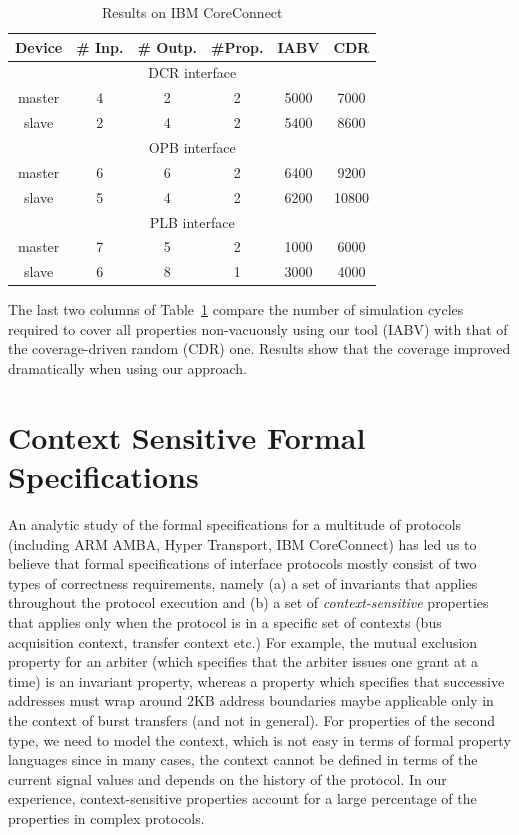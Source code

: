\documentclass[a4paper, 11pt]{article}
\begin{document}
\begin{table}[!t]
\begin{center}
{\small
\begin{tabular}{|c|c|c|c|c|c|} \hline
Device    & \# Inp.    & \# Outp. & \#Prop. & IABV & CDR   \\
\hline %
\multicolumn{6}{|c|}{DCR interface} \\ \hline
master & 4 & 2 & 2 & 5000 & 7000 \\
slave  & 2 & 4 & 2 & 5400 & 8600 \\
\hline
\multicolumn{6}{|c|}{OPB interface} \\ \hline
master  & 6 & 6 & 2 & 6400 & 9200 \\
slave   & 5 & 4 & 2 & 6200 & 10800 \\
\hline
\multicolumn{6}{|c|}{PLB interface} \\ \hline
master  & 7 & 5 & 2 & 1000 & 6000 \\
slave   & 6 & 8 & 1 & 3000 & 4000 \\
\hline
\end{tabular}
}

\end{center}
\caption{Results on IBM CoreConnect} \label{tab1}
\end{table}

The last two columns of Table~\ref{tab1}
compare the number of simulation cycles required to cover all properties
non-vacuously using our tool (IABV) with that of the coverage-driven
random (CDR) one. Results show that the 
coverage improved dramatically when using our approach.

\section{Context Sensitive Formal Specifications} \label{sec5}
An analytic study of the formal specifications for a
multitude of protocols (including ARM AMBA, Hyper Transport,
IBM CoreConnect) has led us to believe that formal specifications of 
interface protocols mostly consist of two types of
correctness requirements, namely (a) a set of invariants
that applies throughout the protocol execution and (b) a set of
{\em context-sensitive} properties that applies only when the protocol is in a
specific set of contexts (bus acquisition context, transfer context etc.)
For example,
the mutual exclusion property for an arbiter (which specifies that
the arbiter issues one grant at a time) is an invariant property,
whereas a property which specifies that successive addresses must
wrap around 2KB address boundaries maybe applicable only in the
context of burst transfers (and not in general). For properties
of the second type, we need to model the context, which is not
easy in terms of formal property languages since in many cases,
the context cannot be defined in terms of the current signal
values and depends on the history of the protocol. In our
experience, context-sensitive properties account for a large
percentage of the properties in complex protocols. 
\end{document}
